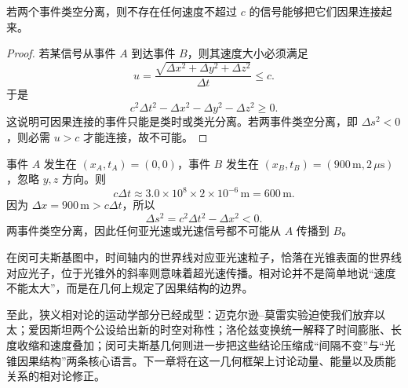 \begin{theorem}[因果约束]
若两个事件类空分离，则不存在任何速度不超过 $c$ 的信号能够把它们因果连接起来。
\end{theorem}

\begin{proof}
若某信号从事件 $A$ 到达事件 $B$，则其速度大小必须满足
\[
 u=\frac{\sqrt{\Delta x^2+\Delta y^2+\Delta z^2}}{\Delta t}\le c.
\]
于是
\[
 c^2\Delta t^2-\Delta x^2-\Delta y^2-\Delta z^2\ge 0.
\]
这说明可因果连接的事件只能是类时或类光分离。若两事件类空分离，即 $\Delta s^2<0$，则必需 $u>c$ 才能连接，故不可能。
\end{proof}

\begin{example}[判断两个事件是否可能有因果关系]
事件 $A$ 发生在 $(x_A,t_A)=(0,0)$，事件 $B$ 发生在 $(x_B,t_B)=(900\,\mathrm{m},2\,\mu\mathrm{s})$，忽略 $y,z$ 方向。则
\[
 c\Delta t\approx 3.0\times 10^8\times 2\times 10^{-6}\,\mathrm{m}=600\,\mathrm{m}.
\]
因为 $\Delta x=900\,\mathrm{m}>c\Delta t$，所以
\[
\Delta s^2=c^2\Delta t^2-\Delta x^2<0.
\]
两事件类空分离，因此任何亚光速或光速信号都不可能从 $A$ 传播到 $B$。
\end{example}

\begin{remark}
在闵可夫斯基图中，时间轴内的世界线对应亚光速粒子，恰落在光锥表面的世界线对应光子，位于光锥外的斜率则意味着超光速传播。相对论并不是简单地说“速度不能太大”，而是在几何上规定了因果结构的边界。
\end{remark}

至此，狭义相对论的运动学部分已经成型：迈克尔逊--莫雷实验迫使我们放弃以太；爱因斯坦两个公设给出新的时空对称性；洛伦兹变换统一解释了时间膨胀、长度收缩和速度叠加；闵可夫斯基几何则进一步把这些结论压缩成“间隔不变”与“光锥因果结构”两条核心语言。下一章将在这一几何框架上讨论动量、能量以及质能关系的相对论修正。

